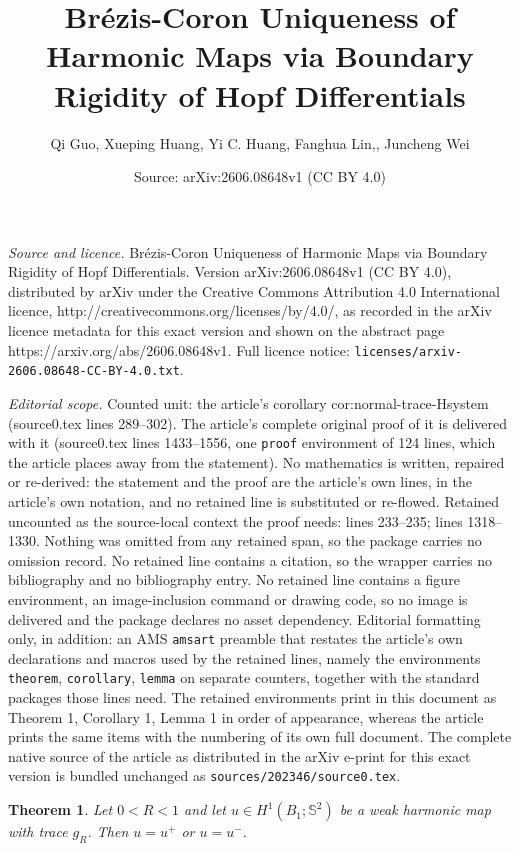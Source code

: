 \documentclass[10pt,a4paper]{amsart}
\title{Br\'ezis-Coron Uniqueness of Harmonic Maps via Boundary Rigidity of Hopf Differentials}
\author{Qi Guo, Xueping Huang, Yi C. Huang, Fanghua Lin,, Juncheng Wei}
\date{Source: arXiv:2606.08648v1 (CC BY 4.0)}
\newtheorem{theorem}{Theorem}
\newcommand{\Sph}{\mathbb{S}^2}
\begin{document}
\maketitle

\noindent\emph{Source and licence.} Br\'ezis-Coron Uniqueness of Harmonic Maps via Boundary Rigidity of Hopf Differentials. Version arXiv:2606.08648v1 (CC BY 4.0), distributed by arXiv under the Creative Commons Attribution 4.0 International licence, http://creativecommons.org/licenses/by/4.0/, as recorded in the arXiv licence metadata for this exact version and shown on the abstract page https://arxiv.org/abs/2606.08648v1. Full licence notice: \texttt{licenses/arxiv-2606.08648-CC-BY-4.0.txt}.\par\smallskip

\noindent\textit{Editorial scope.} Counted unit: the article's corollary cor:normal-trace-Hsystem (source0.tex lines 289--302). The article's complete original proof of it is delivered with it (source0.tex lines 1433--1556, one \texttt{proof} environment of 124 lines, which the article places away from the statement). No mathematics is written, repaired or re-derived: the statement and the proof are the article's own lines, in the article's own notation, and no retained line is substituted or re-flowed.  Retained uncounted as the source-local context the proof needs: lines 233--235; lines 1318--1330.  Nothing was omitted from any retained span, so the package carries no omission record.  No retained line contains a citation, so the wrapper carries no bibliography and no bibliography entry.  No retained line contains a figure environment, an image-inclusion command or drawing code, so no image is delivered and the package declares no asset dependency.  Editorial formatting only, in addition: an AMS \texttt{amsart} preamble that restates the article's own declarations and macros used by the retained lines, namely the environments \texttt{theorem}, \texttt{corollary}, \texttt{lemma} on separate counters, together with the standard packages those lines need.  The retained environments print in this document as Theorem 1, Corollary 1, Lemma 1 in order of appearance, whereas the article prints the same items with the numbering of its own full document.  The complete native source of the article as distributed in the arXiv e-print for this exact version is bundled unchanged as \texttt{sources/202346/source0.tex}.
\begin{theorem}\label{thm:main}
Let $0<R<1$ and let $u\in H^1(B_1;\Sph)$ be a weak harmonic map with trace $g_R$. Then $u=u^+$ or $u=u^-$.
\end{theorem}
\end{document}
